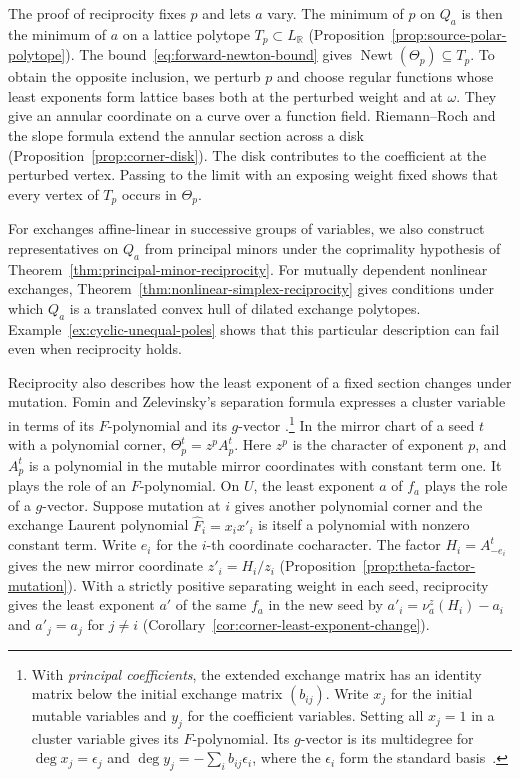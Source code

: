\documentclass[11pt,reqno]{amsart}
\numberwithin{equation}{section}
\theoremstyle{definition}
\theoremstyle{remark}
\DeclareMathOperator{\Newt}{Newt}
\begin{document}
The proof of reciprocity fixes \(p\) and lets \(a\) vary. The minimum
of \(p\) on \(Q_a\) is then the minimum of \(a\) on a lattice polytope
\(T_p\subset L_{\mathbb R}\) (Proposition~\ref{prop:source-polar-polytope}).
The bound~\eqref{eq:forward-newton-bound} gives \(\Newt(\Theta_p)\subseteq T_p\). To obtain
the opposite inclusion, we perturb \(p\) and choose regular functions
whose least exponents form lattice bases both at the perturbed weight
and at \(\omega\). They give an annular coordinate on a curve over a
function field. Riemann--Roch and the slope formula extend the annular
section across a disk (Proposition~\ref{prop:corner-disk}). The disk
contributes to the coefficient at the perturbed vertex. Passing to
the limit with an exposing weight fixed shows that every vertex of
\(T_p\) occurs in \(\Theta_p\).

For exchanges affine-linear in successive groups of variables, we also
construct representatives on \(Q_a\) from principal minors under the
coprimality hypothesis of Theorem~\ref{thm:principal-minor-reciprocity}.
For mutually dependent nonlinear exchanges, Theorem~\ref{thm:nonlinear-simplex-reciprocity}
gives conditions under which \(Q_a\) is a translated convex hull of
dilated exchange polytopes. Example~\ref{ex:cyclic-unequal-poles} shows
that this particular description can fail even when reciprocity holds.

Reciprocity also describes how the least exponent of a fixed section
changes under mutation. Fomin and Zelevinsky's separation formula expresses a cluster
variable in terms of its \(F\)-polynomial and its \(g\)-vector
\cite[Corollary~6.3]{FZIV}.\footnote{With \emph{principal coefficients},
the extended exchange matrix has an identity matrix below the initial
exchange matrix \((b_{ij})\). Write \(x_j\) for the initial mutable
variables and \(y_j\) for the coefficient variables. Setting all
\(x_j=1\) in a cluster variable gives its \(F\)-polynomial. Its
\(g\)-vector is its multidegree for \(\deg x_j=\epsilon_j\) and
\(\deg y_j=-\sum_i b_{ij}\epsilon_i\), where the \(\epsilon_i\) form the
standard basis~\cite[Definitions~3.1, 3.3 and \S6]{FZIV}.}
In the mirror chart of a seed \(t\) with a polynomial corner,
\(\Theta_p^t=z^pA_p^t\). Here \(z^p\) is the character of exponent
\(p\), and \(A_p^t\) is a polynomial in the mutable mirror coordinates
with constant term one. It plays the role of an \(F\)-polynomial. On
\(U\), the least exponent \(a\) of \(f_a\) plays the role of a
\(g\)-vector. Suppose mutation at \(i\) gives another polynomial corner
and the exchange Laurent polynomial \(\widehat F_i=x_ix'_i\) is
itself a polynomial with nonzero constant term. Write \(e_i\) for the
\(i\)-th coordinate cocharacter. The factor \(H_i=A_{-e_i}^t\)
gives the new mirror coordinate \(z'_i=H_i/z_i\)
(Proposition~\ref{prop:theta-factor-mutation}). With a strictly positive
separating weight in each seed, reciprocity gives the least exponent
\(a'\) of the same \(f_a\) in the new seed by
\(a'_i=\nu^z_a(H_i)-a_i\) and \(a'_j=a_j\) for \(j\ne i\)
(Corollary~\ref{cor:corner-least-exponent-change}).
\end{document}
